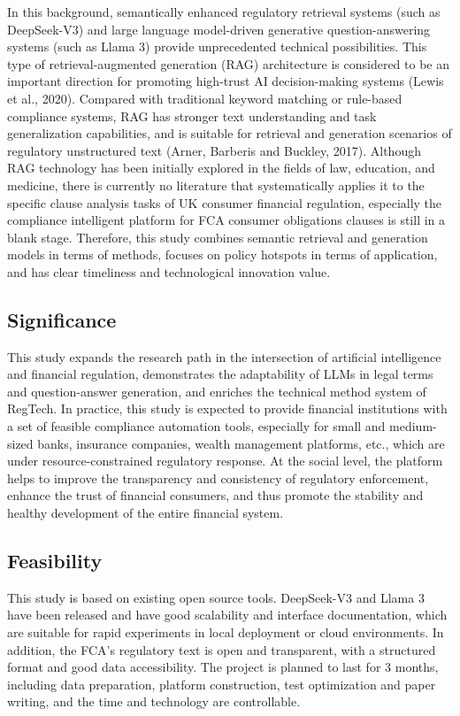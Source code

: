 \documentclass[a4paper,11pt]{article}
\begin{document}
In this background, semantically enhanced regulatory retrieval systems (such as DeepSeek-V3) and large language model-driven generative question-answering systems (such as Llama 3) provide unprecedented technical possibilities. This type of retrieval-augmented generation (RAG) architecture is considered to be an important direction for promoting high-trust AI decision-making systems (Lewis et al., 2020). Compared with traditional keyword matching or rule-based compliance systems, RAG has stronger text understanding and task generalization capabilities, and is suitable for retrieval and generation scenarios of regulatory unstructured text (Arner, Barberis and Buckley, 2017). Although RAG technology has been initially explored in the fields of law, education, and medicine, there is currently no literature that systematically applies it to the specific clause analysis tasks of UK consumer financial regulation, especially the compliance intelligent platform for FCA consumer obligations clauses is still in a blank stage. Therefore, this study combines semantic retrieval and generation models in terms of methods, focuses on policy hotspots in terms of application, and has clear timeliness and technological innovation value.

\subsection{Significance}

This study expands the research path in the intersection of artificial intelligence and financial regulation, demonstrates the adaptability of LLMs in legal terms and question-answer generation, and enriches the technical method system of RegTech. In practice, this study is expected to provide financial institutions with a set of feasible compliance automation tools, especially for small and medium-sized banks, insurance companies, wealth management platforms, etc., which are under resource-constrained regulatory response. At the social level, the platform helps to improve the transparency and consistency of regulatory enforcement, enhance the trust of financial consumers, and thus promote the stability and healthy development of the entire financial system.

\subsection{Feasibility}

This study is based on existing open source tools. DeepSeek-V3 and Llama 3 have been released and have good scalability and interface documentation, which are suitable for rapid experiments in local deployment or cloud environments. In addition, the FCA's regulatory text is open and transparent, with a structured format and good data accessibility. The project is planned to last for 3 months, including data preparation, platform construction, test optimization and paper writing, and the time and technology are controllable.
\end{document}
